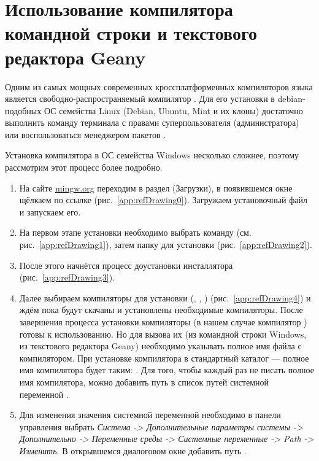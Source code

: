 \chapter{Использование компилятора командной строки и текстового редактора Geany}

Одним из самых мощных современных кроссплатформенных компиляторов языка  является свободно-распространяемый
компилятор . Для его установки в debian-подобных ОС семейства Linux (Debian, Ubuntu, Mint и их клоны) достаточно
выполнить команду терминала  с правами суперпользователя (администратора) или
воспользоваться менеджером пакетов .

Установка компилятора  в ОС семейства Windows несколько сложнее, поэтому  рассмотрим этот процесс более подробно.

\begin{enumerate}
\item На сайте \url{mingw.org} переходим в раздел  (Загрузки), в появившемся окне щёлкаем по ссылке
 (рис.~\ref{app:refDrawing0}). Загружаем установочный файл и запускаем его.
\item На первом этапе установки необходимо выбрать команду  (см. рис.~\ref{app:refDrawing1}), затем
папку для установки (рис.~\ref{app:refDrawing2}).
\item После этого начнётся процесс доустановки инсталлятора (рис.~\ref{app:refDrawing3}).
\item Далее выбираем компиляторы для установки (, , ) (рис.~\ref{app:refDrawing4}) и ждём пока будут
скачаны и установлены необходимые компиляторы. После завершения процесса установки компиляторы (в нашем случае
компилятор ) готовы к использованию. Но для вызова их (из командной строки Windows, из текстового редактора Geany)
необходимо указывать полное имя файла с компилятором. При установке компилятора  в стандартный каталог
 --- полное имя компилятора  будет таким:
. Для того, чтобы каждый раз не писать полное имя
компилятора, можно добавить путь   в список путей системной
переменной .
\item Для изменения значения системной переменной  необходимо в панели управления выбрать \emph{Система ->
Дополнительные параметры системы -> Дополнительно -> Переменные среды -> Системные переменные -> Path -> Изменить}. В
открывшемся диалоговом окне добавить путь .
\end{enumerate}

